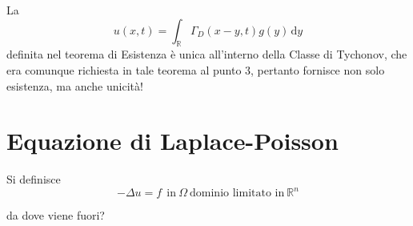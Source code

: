 \documentclass[10pt,a4paper,twoside,openright]{book}
\newcommand{\de}{\,\mathrm d}
\newcommand{\dy}{\de y}
\begin{document}
La
\begin{equation*}
    u(x,t) =\int _{\mathbb{R}} \Gamma _{D}(x-y,t) g(y) \dy
\end{equation*}
definita nel teorema di Esistenza è unica all'interno della Classe di Tychonov, che era comunque richiesta in tale teorema al punto $3$, pertanto fornisce non solo esistenza, ma anche unicità!
\chapter{Equazione di Laplace-Poisson}
\begin{definition}
     Si definisce
    \begin{equation*}
        \boxed{-\Delta u=f} \ \ \text{in} \ \Omega \ \text{dominio limitato in} \ \mathbb{R}^{n}
    \end{equation*}
\end{definition}
da dove viene fuori?
\end{document}
